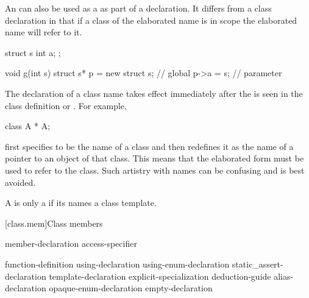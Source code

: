 \pnum
{}%
%
\begin{note}
An  can also
be used as a  as part of a declaration. It
differs from a class declaration in that if a class of the elaborated
name is in scope the elaborated name will refer to it.
\end{note}
\begin{example}
\begin{codeblock}
struct s { int a; };

void g(int s) {
  struct s* p = new struct s;   // global 
  p->a = s;                     // parameter 
}
\end{codeblock}
\end{example}

\pnum
{}%
\begin{note}
The declaration of a class name takes effect immediately after the
 is seen in the class definition or
. For example,
\begin{codeblock}
class A * A;
\end{codeblock}
first specifies  to be the name of a class and then redefines
it as the name of a pointer to an object of that class. This means that
the elaborated form   must be used to refer to the
class. Such artistry with names can be confusing and is best avoided.
\end{note}

\pnum
{}%
A  is only a 
if its  names a class template.

[class.mem]{Class members}%
%

\begin{bnf}
\br
    member-declaration \br
    access-specifier \terminal{:} 
\end{bnf}

\begin{bnf}
\br
       \terminal{;}\br
    function-definition\br
    using-declaration\br
    using-enum-declaration\br
    static_assert-declaration\br
    template-declaration\br
    explicit-specialization\br
    deduction-guide\br
    alias-declaration\br
    opaque-enum-declaration\br
    empty-declaration
\end{bnf}

